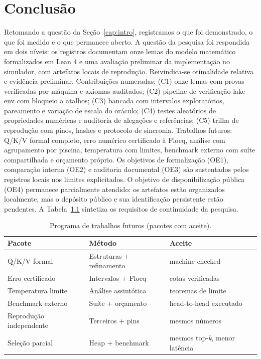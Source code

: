 \documentclass[12pt,openany,oneside,a4paper,brazil,chapter=TITLE]{abntex2}
\begin{document}
\chapter{Conclusão}\label{cap:conclusao}
Retomando a questão da Seção~\ref{cap:intro}, registramos o que foi demonstrado, o que foi medido e o que permanece aberto.
A questão da pesquisa foi respondida em dois níveis: os registros documentam onze lemas do modelo matemático formalizados em Lean 4 e uma avaliação preliminar da implementação no simulador, com artefatos locais de reprodução. Reivindica-se otimalidade relativa e evidência preliminar. Contribuições numeradas: (C1) onze lemas com provas verificadas por máquina e axiomas auditados; (C2) pipeline de verificação lake-env com bloqueio a atalhos; (C3) bancada com intervalos exploratórios, pareamento e variação de escala do oráculo; (C4) testes aleatórios de propriedades numéricas e auditoria de alegações e referências; (C5) trilha de reprodução com pinos, hashes e protocolo de sincronia. Trabalhos futuros: Q/K/V formal completo, erro numérico certificado à Flocq, análise com agrupamento por piscina, temperatura com limites, benchmark externo com suíte compartilhada e orçamento próprio.
Os objetivos de formalização (OE1), comparação interna (OE2) e auditoria documental (OE3) são sustentados pelos registros locais nos limites explicitados. O objetivo de disponibilização pública (OE4) permanece parcialmente atendido: os artefatos estão organizados localmente, mas o depósito público e sua identificação persistente estão pendentes.
A Tabela~\ref{tab:futuro} sintetiza os requisitos de continuidade da pesquisa.
\begin{table}[htbp]
\fontsize{10}{12}\selectfont\SingleSpacing
\centering
\caption{Programa de trabalhos futuros (pacotes com aceite).}
\label{tab:futuro}
\begin{tabularx}{\textwidth}{lXX}
\toprule
Pacote & Método & Aceite \\
\midrule
Q/K/V formal & Estruturas + refinamento & machine-checked \\
Erro certificado & Intervalos + Flocq & cotas verificadas \\
Temperatura limite & Análise assintótica & teoremas de limite \\
Benchmark externo & Suíte + orçamento & head-to-head executado \\
Reprodução independente & Terceiros + pins & mesmos números \\
Seleção parcial & Heap + benchmark & mesmos top-\textit{k}, menor latência \\
\bottomrule
\end{tabularx}
\end{table}
\end{document}
